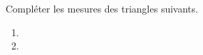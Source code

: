 
\begin{exercice}\label{exosmath-0842}

    Compléter les mesures des triangles suivants.

    \begin{multicols}{2}
        \begin{enumerate}
            \item
   
   \item
   
        \end{enumerate}
    \end{multicols}

\end{exercice}

